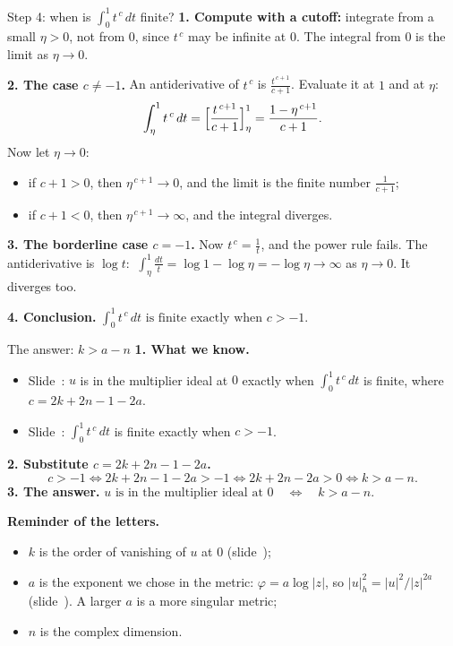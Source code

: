 \begin{frame}{Step 4: when is \(\int_0^1t^{\,c}\,dt\) finite?}
\label{fr:step-when-is-t-50}
\textbf{1. Compute with a cutoff:} integrate from a small \(\eta>0\), not from \(0\), since \(t^{\,c}\) may be infinite at \(0\). The integral from \(0\) is the limit as \(\eta\to0\).
\par
\textbf{2. The case \(c\ne-1\).} An antiderivative of \(t^{\,c}\) is \(\frac{t^{\,c+1}}{c+1}\). Evaluate it at \(1\) and at \(\eta\):
\[
\int_\eta^1t^{\,c}\,dt=\Bigl[\frac{t^{\,c+1}}{c+1}\Bigr]_\eta^1=\frac{1-\eta^{\,c+1}}{c+1}.
\]
Now let \(\eta\to0\):
\begin{itemize}
\item if \(c+1>0\), then \(\eta^{\,c+1}\to0\), and the limit is the finite number \(\frac{1}{c+1}\);
\item if \(c+1<0\), then \(\eta^{\,c+1}\to\infty\), and the integral diverges.
\end{itemize}
\textbf{3. The borderline case \(c=-1\).} Now \(t^{\,c}=\frac1t\), and the power rule fails. The antiderivative is \(\log t\):
\(\ \int_\eta^1\frac{dt}{t}=\log1-\log\eta=-\log\eta\to\infty\) as \(\eta\to0\). It diverges too.
\par
\textbf{4. Conclusion.}\quad
\(\boxed{\int_0^1t^{\,c}\,dt \text{ is finite exactly when } c>-1 .}\)
\end{frame}

\begin{frame}{The answer: \(k>a-n\)}
\textbf{1. What we know.}
\begin{itemize}
\item Slide~\hyperlink{fr:step-conclusion-compare-with-49}{\pageref{fr:step-conclusion-compare-with-49}}: \(u\) is in the multiplier ideal at \(0\) exactly when \(\int_0^1t^{\,c}\,dt\) is finite, where \(c=2k+2n-1-2a\).
\item Slide~\hyperlink{fr:step-when-is-t-50}{\pageref{fr:step-when-is-t-50}}: \(\int_0^1t^{\,c}\,dt\) is finite exactly when \(c>-1\).
\end{itemize}
\textbf{2. Substitute \(c=2k+2n-1-2a\).}
\[
c>-1
\iff 2k+2n-1-2a>-1
\iff 2k+2n-2a>0
\iff k>a-n .
\]
\textbf{3. The answer.}\quad
\(\boxed{u \text{ is in the multiplier ideal at } 0
\quad\Longleftrightarrow\quad k>a-n .}\)
\par\medskip
\textbf{Reminder of the letters.}
\begin{itemize}
\item \(k\) is the order of vanishing of \(u\) at \(0\) (slide~\hyperlink{fr:step-how-u-behaves-46}{\pageref{fr:step-how-u-behaves-46}});
\item \(a\) is the exponent we chose in the metric: \(\varphi=a\log|z|\), so \(|u|_h^2=|u|^2/|z|^{2a}\) (slide~\hyperlink{fr:example-a-logarithmic-pole-43}{\pageref{fr:example-a-logarithmic-pole-43}}). A larger \(a\) is a more singular metric;
\item \(n\) is the complex dimension.
\end{itemize}
\end{frame}

